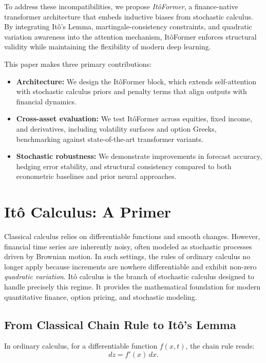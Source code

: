 \documentclass[10pt,twocolumn]{article}
\begin{document}
To address these incompatibilities, we propose \emph{It\^oFormer}, a finance-native transformer architecture that embeds inductive biases from stochastic calculus. By integrating Itô’s Lemma, martingale-consistency constraints, and quadratic variation awareness into the attention mechanism, It\^oFormer enforces structural validity while maintaining the flexibility of modern deep learning. 

This paper makes three primary contributions:
\begin{itemize}
    \item \textbf{Architecture:} We design the It\^oFormer block, which extends self-attention with stochastic calculus priors and penalty terms that align outputs with financial dynamics.
    \item \textbf{Cross-asset evaluation:} We test It\^oFormer across equities, fixed income, and derivatives, including volatility surfaces and option Greeks, benchmarking against state-of-the-art transformer variants.
    \item \textbf{Stochastic robustness:} We demonstrate improvements in forecast accuracy, hedging error stability, and structural consistency compared to both econometric baselines and prior neural approaches.
\end{itemize}

\section{It\^o Calculus: A Primer}

Classical calculus relies on differentiable functions and smooth changes. 
However, financial time series are inherently noisy, often modeled as stochastic processes driven by Brownian motion. 
In such settings, the rules of ordinary calculus no longer apply because increments are nowhere differentiable and exhibit non-zero \emph{quadratic variation}. 
It\^o calculus \cite{ito1944stochastic,oksendal2003sde} is the branch of stochastic calculus designed to handle precisely this regime. 
It provides the mathematical foundation for modern quantitative finance, option pricing, and stochastic modeling.

\subsection{From Classical Chain Rule to It\^o's Lemma}

In ordinary calculus, for a differentiable function $f(x,t)$, the chain rule reads:
\[
dz = f'(x) \, dx.
\]
\end{document}

